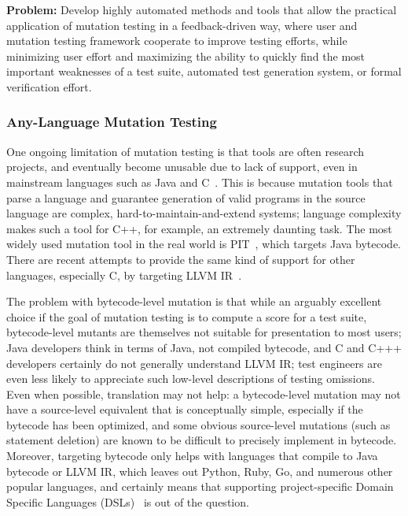 \begin{framed}
{\bf Problem:}  Develop highly automated methods and tools that allow the practical application of mutation testing in a feedback-driven way, where user and mutation testing framework cooperate to improve testing efforts, while minimizing user effort and maximizing the ability to quickly find the most important weaknesses of a test suite, automated test generation system, or formal verification effort.
\end{framed}

\subsubsection{Any-Language Mutation Testing}

One ongoing limitation of mutation testing is that tools are often research projects, and eventually become unusable due to lack of support, even in mainstream languages such as Java and C~\cite{MutChoice}.  This is because mutation tools that parse a language and guarantee generation of valid programs in the source language are complex, hard-to-maintain-and-extend systems; language complexity makes such a tool for C++, for example, an extremely daunting task.  The most widely used mutation tool in the real world is PIT~\cite{pittest}, which targets Java bytecode.  There are recent attempts to provide the same kind of support for other languages, especially C, by targeting LLVM IR~\cite{HaririLLVM}.

The problem with bytecode-level mutation is that while an arguably excellent choice if the goal of mutation testing is to compute a score for a test suite, bytecode-level mutants are themselves not suitable for presentation to most users; Java developers think in terms of Java, not compiled bytecode, and C and C+++ developers certainly do not generally understand LLVM IR; test engineers are even less likely to appreciate such low-level descriptions of testing omissions.  Even when possible, translation may not help: a bytecode-level mutation may not have a source-level equivalent that is conceptually simple, especially if the bytecode has been optimized, and some obvious source-level mutations (such as statement deletion) are known to be difficult to precisely implement in bytecode.  Moreover, targeting bytecode only helps with languages that compile to Java bytecode or LLVM IR, which leaves out Python, Ruby, Go, and numerous other popular languages, and certainly means that supporting project-specific Domain Specific Languages (DSLs)~\cite{Fow10} is out of the question.

